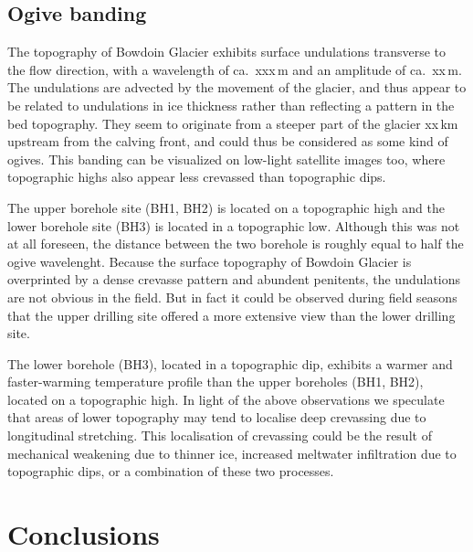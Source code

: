 \documentclass[utf8]{article}
\begin{document}
\subsection{Ogive banding}

    The topography of Bowdoin Glacier exhibits surface undulations transverse
    to the flow direction, with a wavelength of ca.~xxx\,m and an amplitude of
    ca.~xx\,m. The undulations are advected by the movement of the glacier, and
    thus appear to be related to undulations in ice thickness rather than
    reflecting a pattern in the bed topography. They seem to originate from a
    steeper part of the glacier xx\,km upstream from the calving front, and
    could thus be considered as some kind of ogives. This banding can be
    visualized on low-light satellite images too, where topographic highs also
    appear less crevassed than topographic dips.

    The upper borehole site (BH1, BH2) is located on a topographic high and the
    lower borehole site (BH3) is located in a topographic low. Although this
    was not at all foreseen, the distance between the two borehole is roughly
    equal to half the ogive wavelenght. Because the surface topography of
    Bowdoin Glacier is overprinted by a dense crevasse pattern and abundent
    penitents, the undulations are not obvious in the field.  But in fact it
    could be observed during field seasons that the upper drilling site offered
    a more extensive view than the lower drilling site.

    The lower borehole (BH3), located in a topographic dip, exhibits a warmer
    and faster-warming temperature profile than the upper boreholes (BH1, BH2),
    located on a topographic high. In light of the above observations we
    speculate that areas of lower topography may tend to localise deep
    crevassing due to longitudinal stretching. This localisation of crevassing
    could be the result of mechanical weakening due to thinner ice, increased
    meltwater infiltration due to topographic dips, or a combination of these
    two processes.


\section{Conclusions}
\end{document}
